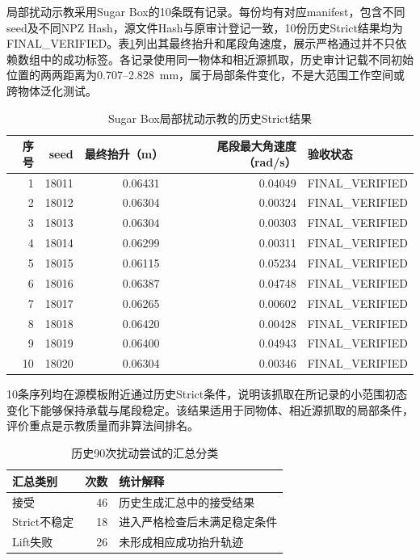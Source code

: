 局部扰动示教采用Sugar Box的10条既有记录。每份均有对应manifest，包含不同seed及不同NPZ Hash，源文件Hash与原审计登记一致，10份历史Strict结果均为FINAL\_VERIFIED。表\ref{tab:ch03_sugar_strict}列出其最终抬升和尾段角速度，展示严格通过并不只依赖数组中的成功标签。各记录使用同一物体和相近源抓取，历史审计记载不同初始位置的两两距离为0.707--2.828~mm，属于局部条件变化，不是大范围工作空间或跨物体泛化测试。

\begin{table}[htbp]
 \centering\small
 \caption{Sugar Box局部扰动示教的历史Strict结果}
 \label{tab:ch03_sugar_strict}
 \begin{tabular}{rrrrl}
 \hline
 序号 & seed & 最终抬升（m） & 尾段最大角速度（rad/s） & 验收状态\\
 \hline
 1 & 18011 & 0.06431 & 0.04049 & FINAL\_VERIFIED\\
 2 & 18012 & 0.06304 & 0.00324 & FINAL\_VERIFIED\\
 3 & 18013 & 0.06304 & 0.00303 & FINAL\_VERIFIED\\
 4 & 18014 & 0.06299 & 0.00311 & FINAL\_VERIFIED\\
 5 & 18015 & 0.06115 & 0.05234 & FINAL\_VERIFIED\\
 6 & 18016 & 0.06387 & 0.04748 & FINAL\_VERIFIED\\
 7 & 18017 & 0.06265 & 0.00602 & FINAL\_VERIFIED\\
 8 & 18018 & 0.06420 & 0.00428 & FINAL\_VERIFIED\\
 9 & 18019 & 0.06400 & 0.04943 & FINAL\_VERIFIED\\
 10 & 18020 & 0.06304 & 0.00346 & FINAL\_VERIFIED\\
 \hline
 \end{tabular}
\end{table}

10条序列均在源模板附近通过历史Strict条件，说明该抓取在所记录的小范围初态变化下能够保持承载与尾段稳定。该结果适用于同物体、相近源抓取的局部条件，评价重点是示教质量而非算法间排名。

\begin{table}[htbp]
 \centering\small
 \caption{历史90次扰动尝试的汇总分类}
 \label{tab:ch03_generation_failures}
 \begin{tabular}{lrp{}}
 \hline
 汇总类别 & 次数 & 统计解释\\
 \hline
 接受 & 46 & 历史生成汇总中的接受结果\\
 Strict不稳定 & 18 & 进入严格检查后未满足稳定条件\\
 Lift失败 & 26 & 未形成相应成功抬升轨迹\\
 \hline
 \end{tabular}
\end{table}

